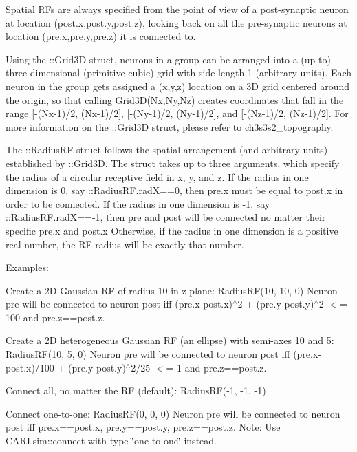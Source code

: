 Spatial R\+Fs are always specified from the point of view of a post-\/synaptic neuron at location (post.\+x,post.\+y,post.\+z), looking back on all the pre-\/synaptic neurons at location (pre.\+x,pre.\+y,pre.\+z) it is connected to.

Using the \+::\+Grid3D struct, neurons in a group can be arranged into a (up to) three-\/dimensional (primitive cubic) grid with side length 1 (arbitrary units). Each neuron in the group gets assigned a (x,y,z) location on a 3D grid centered around the origin, so that calling Grid3\+D(\+Nx,\+Ny,\+Nz) creates coordinates that fall in the range \mbox{[}-\/(Nx-\/1)/2, (Nx-\/1)/2\mbox{]}, \mbox{[}-\/(Ny-\/1)/2, (Ny-\/1)/2\mbox{]}, and \mbox{[}-\/(Nz-\/1)/2, (Nz-\/1)/2\mbox{]}. For more information on the \+::\+Grid3D struct, please refer to ch3s3s2\+\_\+topography.

The \+::\+Radius\+RF struct follows the spatial arrangement (and arbitrary units) established by \+::\+Grid3D. The struct takes up to three arguments, which specify the radius of a circular receptive field in x, y, and z. If the radius in one dimension is 0, say \+::\+Radius\+R\+F.\+radX==0, then pre.\+x must be equal to post.\+x in order to be connected. If the radius in one dimension is -\/1, say \+::\+Radius\+R\+F.\+radX==-\/1, then pre and post will be connected no matter their specific pre.\+x and post.\+x Otherwise, if the radius in one dimension is a positive real number, the RF radius will be exactly that number.

Examples\+:
\begin{DoxyItemize}
\item Create a 2D Gaussian RF of radius 10 in z-\/plane\+: Radius\+R\+F(10, 10, 0) Neuron pre will be connected to neuron post iff (pre.\+x-\/post.\+x)$^\wedge$2 + (pre.\+y-\/post.\+y)$^\wedge$2 $<$= 100 and pre.\+z==post.\+z.
\item Create a 2D heterogeneous Gaussian RF (an ellipse) with semi-\/axes 10 and 5\+: Radius\+R\+F(10, 5, 0) Neuron pre will be connected to neuron post iff (pre.\+x-\/post.\+x)/100 + (pre.\+y-\/post.\+y)$^\wedge$2/25 $<$= 1 and pre.\+z==post.\+z.
\item Connect all, no matter the RF (default)\+: Radius\+RF(-\/1, -\/1, -\/1)
\item Connect one-\/to-\/one\+: Radius\+R\+F(0, 0, 0) Neuron pre will be connected to neuron post iff pre.\+x==post.\+x, pre.\+y==post.\+y, pre.\+z==post.\+z. Note\+: Use C\+A\+R\+Lsim\+::connect with type \char`\"{}one-\/to-\/one\char`\"{} instead.
\end{DoxyItemize}

